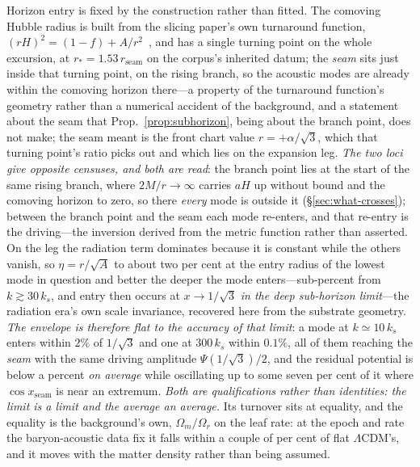 \documentclass[11pt,a4paper]{article}
\theoremstyle{plain}
\theoremstyle{definition}
\theoremstyle{remark}
\begin{document}
Horizon entry is fixed by the construction rather than fitted. The comoving Hubble radius is built from the
slicing paper's own turnaround function, $(rH)^{2}=(1-f)+A/r^{2}$~\cite{JanzenSlicing}, and has a single
turning point on the whole excursion, at $r_{*}=1.53\,r_{\mathrm{seam}}$ on the corpus's inherited datum; the
\emph{seam} sits just inside that turning point, on the rising branch, so the acoustic modes are already within
the comoving horizon there---a property of the turnaround function's geometry rather than a
numerical accident of the background, and a statement about the seam that Prop.~\ref{prop:subhorizon}, being about the branch point, does not make; the seam meant is the front chart value $r=+\alpha/\sqrt3$, which that turning point's ratio picks out and which lies on the expansion leg. \emph{The two loci give opposite censuses, and both are read}: the branch point lies at the start of the same
rising branch, where $2M/r\to\infty$ carries $aH$ up without bound and the comoving horizon to zero, so there
\emph{every} mode is outside it (\S\ref{sec:what-crosses}); between the branch point and the seam each mode
re-enters, and that re-entry is the driving---the inversion derived from the metric function rather than asserted. On the leg the radiation term dominates because it is constant
while the others vanish, so $\eta=r/\sqrt A$ to about two per cent at the entry radius of the lowest mode in
question and better the deeper the mode enters---sub-percent from $k\gtrsim30\,k_{s}$, and entry then occurs at $x\to1/\sqrt3$ \emph{in the deep sub-horizon limit}---the radiation
era's own scale invariance, recovered here from the substrate geometry. \emph{The envelope is therefore flat to the accuracy of that limit}: a mode at $k\simeq10\,k_{s}$ enters within $2\%$ of $1/\sqrt3$ and one at $300\,k_{s}$ within $0.1\%$, all of them reaching the \emph{seam} with the same driving amplitude $\Psi(1/\sqrt3)/2$, and the residual potential is below a percent \emph{on average} while oscillating up to some seven per cent of it where $\cos x_{\mathrm{seam}}$ is near an extremum. \emph{Both are qualifications rather than identities: the limit is a limit and the average an average.} Its turnover sits at equality, and the equality is the background's own, $\Omega_m/\Omega_r$ on the leaf rate: at the epoch and rate the baryon-acoustic data fix it falls within a couple of per cent of flat $\Lambda$CDM's, and it moves with the matter density rather than being assumed.
\end{document}
